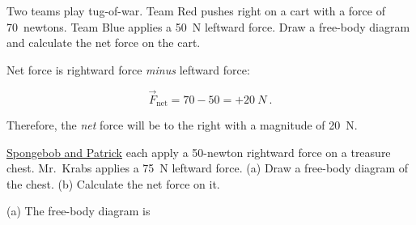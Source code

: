 \documentclass{article}
\numberwithin{equation}{section}
\numberwithin{figure}{section}
\begin{document}
\begin{example} \label{ex:FnetFromFBD} 
    Two teams play tug-of-war. Team Red pushes right on a cart with a force of \SI{70}{newtons}. Team Blue applies a \SI{50}{N} leftward force. Draw a free-body diagram and calculate the net force on the cart.
\end{example}

\Solution

\begin{figure}[h!]
    \centering
{}
\end{figure}

Net force is rightward force \textit{minus} leftward force:

\begin{equation*}
    \vec{F}_{\text{net}} = 70 - 50 = +\SI{20}{N}\ .
\end{equation*}

Therefore, the \textit{net} force will be to the right with a magnitude of \SI{20}{N}.

\begin{example}
\href{https://youtu.be/7e3XhWMHolU}{Spongebob and Patrick} each apply a 50-newton rightward force on a treasure chest. Mr.~Krabs applies a \SI{75}{N} leftward force. (a) Draw a free-body diagram of the chest. (b) Calculate the net force on it.
\end{example}

\Solution (a) The free-body diagram is

\begin{figure}[h!]
    \centering
{}
\end{figure}
\end{document}
